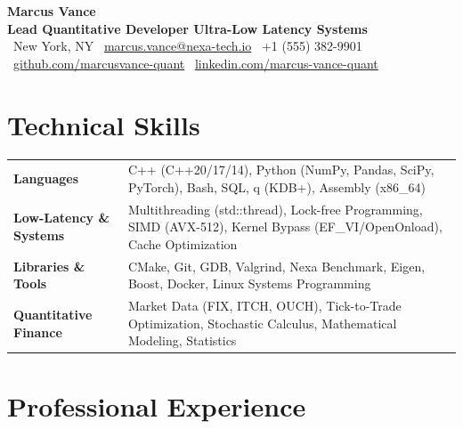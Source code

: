 \documentclass[10pt,letterpaper]{article}
\begin{document}
\color{bodytext}

\begin{center}
    {\Huge \bfseries \color{primary} Marcus Vance} \\
    \vspace{3pt}
    {\large \bfseries \color{accent} Lead Quantitative Developer \quad\textbullet\quad Ultra-Low Latency Systems} \\
    \vspace{5pt}
    \small
    \color{muted}
    \faMapMarker\ New York, NY \quad\textbullet\quad
    \faEnvelope\ \href{mailto:marcus.vance@nexa-tech.io}{marcus.vance@nexa-tech.io} \quad\textbullet\quad
    \faPhone\ +1 (555) 382-9901 \quad\textbullet\quad
    \faGithub\ \href{https://github.com/marcusvance-quant}{github.com/marcusvance-quant} \quad\textbullet\quad
    \faLinkedin\ \href{https://linkedin.com/in/marcus-vance-quant}{linkedin.com/marcus-vance-quant}
\end{center}

\vspace{-4pt}

\section{Technical Skills}
\noindent
\begin{tabularx}{\textwidth}{@{} >{\bfseries\color{primary}}l L @{}}
  Languages & C++ (C++20/17/14), Python (NumPy, Pandas, SciPy, PyTorch), Bash, SQL, q (KDB+), Assembly (x86\_64) \\
  Low-Latency \& Systems & Multithreading (std::thread), Lock-free Programming, SIMD (AVX-512), Kernel Bypass (EF\_VI/OpenOnload), Cache Optimization \\
  Libraries \& Tools & CMake, Git, GDB, Valgrind, Nexa Benchmark, Eigen, Boost, Docker, Linux Systems Programming \\
  Quantitative Finance & Market Data (FIX, ITCH, OUCH), Tick-to-Trade Optimization, Stochastic Calculus, Mathematical Modeling, Statistics \\
\end{tabularx}

\section{Professional Experience}
\end{document}
